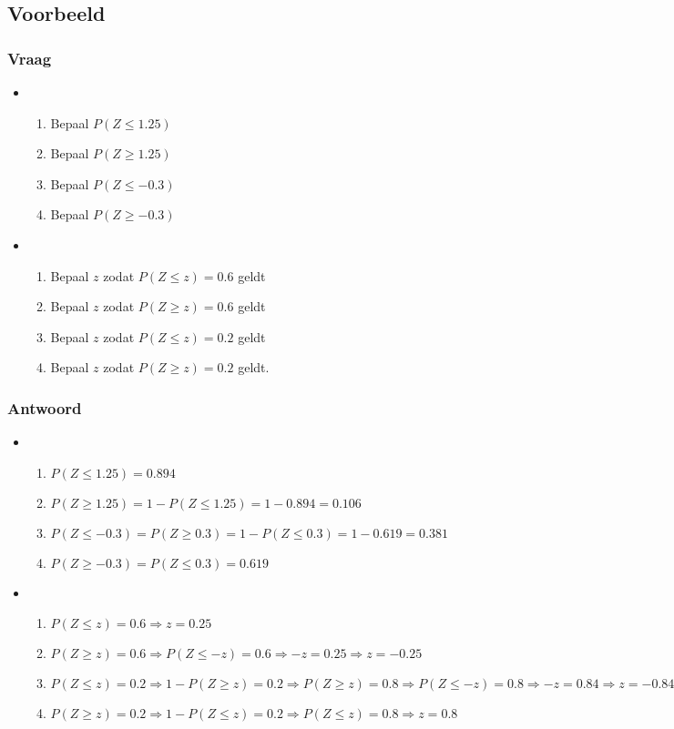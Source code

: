 \documentclass[main.tex]{subfiles}
\begin{document}
\subsection{Voorbeeld}
\subsubsection*{Vraag}
\begin{itemize}
\item
  \begin{enumerate}
  \item Bepaal $P(Z \le 1.25)$
  \item Bepaal $P(Z \ge 1.25)$
  \item Bepaal $P(Z \le -0.3)$
  \item Bepaal $P(Z \ge -0.3)$
  \end{enumerate}
\item
  \begin{enumerate}
  \item Bepaal $z$ zodat $P(Z \le z) = 0.6$ geldt
  \item Bepaal $z$ zodat $P(Z \ge z) = 0.6$ geldt
  \item Bepaal $z$ zodat $P(Z \le z) = 0.2$ geldt
  \item Bepaal $z$ zodat $P(Z \ge z) = 0.2$ geldt.
  \end{enumerate}
\end{itemize}
\subsubsection*{Antwoord}
\begin{itemize}
\item
  \begin{enumerate}
  \item $P(Z \le 1.25) = 0.894$
  \item $P(Z \ge 1.25) = 1-P(Z \le 1.25) = 1- 0.894 = 0.106$
  \item $P(Z \le -0.3) = P(Z \ge 0.3) = 1- P(Z \le 0.3) = 1-0.619 = 0.381$
  \item $P(Z \ge -0.3) = P(Z \le 0.3) = 0.619$
  \end{enumerate}
\item
  \begin{enumerate}
  \item $P(Z \le z) = 0.6 \Rightarrow z = 0.25$
  \item $P(Z \ge z) = 0.6 \Rightarrow P(Z \le -z) = 0.6 \Rightarrow -z = 0.25 \Rightarrow z = -0.25$ 
  \item $P(Z \le z) = 0.2 \Rightarrow 1-P(Z \ge z) = 0.2 \Rightarrow P(Z \ge z) = 0.8 \Rightarrow P(Z \le -z) = 0.8 \Rightarrow -z = 0.84 \Rightarrow z = -0.84$
  \item $P(Z \ge z) = 0.2 \Rightarrow 1-P(Z \le z) = 0.2 \Rightarrow P(Z \le z) = 0.8 \Rightarrow z = 0.8$
  \end{enumerate}
\end{itemize}
\end{document}
